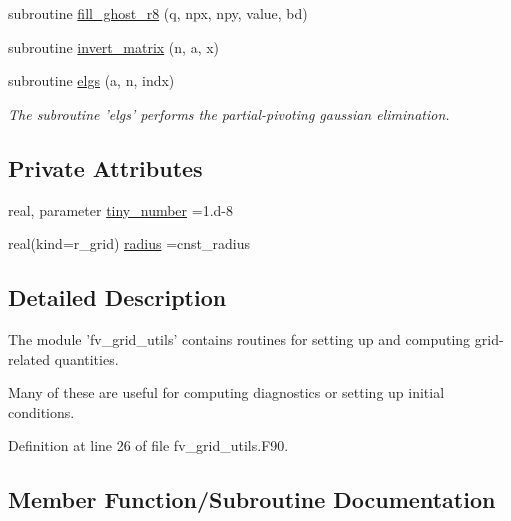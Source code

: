 \begin{DoxyCompactItemize}
subroutine \hyperlink{classfv__grid__utils__mod_a2fe5c8bfcdaf2375a8dd4047cd148326}{fill\-\_\-ghost\-\_\-r8} (q, npx, npy, value, bd)
\item 
subroutine \hyperlink{classfv__grid__utils__mod_a0429313efafc9366ffdd147df45a5585}{invert\-\_\-matrix} (n, a, x)
\item 
subroutine \hyperlink{classfv__grid__utils__mod_aa91273704cafe57dc9fa77eeb2a1f63c}{elgs} (a, n, indx)
\begin{DoxyCompactList}\small\item\em The subroutine 'elgs' performs the partial-\/pivoting gaussian elimination. \end{DoxyCompactList}\end{DoxyCompactItemize}
\subsection*{Private Attributes}
\begin{DoxyCompactItemize}
\item 
real, parameter \hyperlink{classfv__grid__utils__mod_a800597e665792a2ca112d3db14ae3c4c}{tiny\-\_\-number} =1.d-\/8
\item 
real(kind=r\-\_\-grid) \hyperlink{classfv__grid__utils__mod_a9825bfea45f13a48cc658a3df88d3124}{radius} =cnst\-\_\-radius
\end{DoxyCompactItemize}


\subsection{Detailed Description}
The module 'fv\-\_\-grid\-\_\-utils' contains routines for setting up and computing grid-\/related quantities. 

Many of these are useful for computing diagnostics or setting up initial conditions. 

Definition at line 26 of file fv\-\_\-grid\-\_\-utils.\-F90.



\subsection{Member Function/\-Subroutine Documentation}
